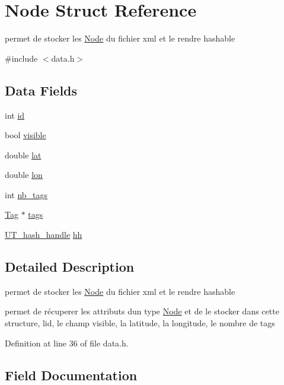 \hypertarget{struct_node}{}\section{Node Struct Reference}
\label{struct_node}


permet de stocker les \hyperlink{struct_node}{Node} du fichier xml et le rendre hashable  




{\ttfamily \#include $<$data.\+h$>$}

\subsection*{Data Fields}
\begin{DoxyCompactItemize}
\item 
int \hyperlink{struct_node_a7441ef0865bcb3db9b8064dd7375c1ea}{id}
\item 
bool \hyperlink{struct_node_aa54a57ae048476d840caf6d4d2c47aa3}{visible}
\item 
double \hyperlink{struct_node_a7972334534f68166121a6e51b0aac2d6}{lat}
\item 
double \hyperlink{struct_node_aa96391e04b5977c50b96d77bea86a01d}{lon}
\item 
int \hyperlink{struct_node_a5090182abe45c6d1577adb6c195378f3}{nb\+\_\+tags}
\item 
\hyperlink{struct_tag}{Tag} $\ast$ \hyperlink{struct_node_a5b3cb60eeefcbc271683754bf243aebb}{tags}
\item 
\hyperlink{struct_u_t__hash__handle}{U\+T\+\_\+hash\+\_\+handle} \hyperlink{struct_node_a67d3d81a4f9a9622b0befade8d131661}{hh}
\end{DoxyCompactItemize}


\subsection{Detailed Description}
permet de stocker les \hyperlink{struct_node}{Node} du fichier xml et le rendre hashable 

permet de récuperer les attributs d\textquotesingle{}un type \hyperlink{struct_node}{Node} et de le stocker dans cette structure, l\textquotesingle{}id, le champ visible, la latitude, la longitude, le nombre de tags 

Definition at line 36 of file data.\+h.



\subsection{Field Documentation}
